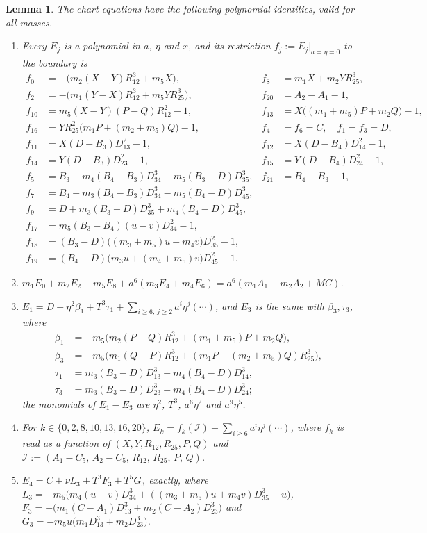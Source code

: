 \documentclass[Threeside,11pt]{article}
\newtheorem{lemma}[theorem]{Lemma}
\theoremstyle{definition}
\theoremstyle{remark}
\numberwithin{equation}{section}
\theoremstyle{remark}
\newenvironment{romanlist}{\begin{enumerate}\renewcommand{\labelenumi}{(\roman{enumi})}%
  \renewcommand{\theenumi}{\roman{enumi}}}{\end{enumerate}}
\begin{document}
{\begin{lemma}\label{lem:d8-rows}
The chart equations have the following polynomial identities, valid for all masses.
\begin{romanlist}
\item Every $E_j$ is a polynomial in $a$, $\eta$ and $x$, and its restriction
$f_j:=E_j|_{a=\eta=0}$ to the boundary is
\begin{align*}
  f_0&=-\bigl(m_2(X-Y)R_{12}^3+m_5X\bigr), & f_8&=m_1X+m_2YR_{25}^3,\\
  f_2&=-\bigl(m_1(Y-X)R_{12}^3+m_5YR_{25}^3\bigr), & f_{20}&=A_2-A_1-1,\\
  f_{10}&=m_5(X-Y)(P-Q)R_{12}^2-1, & f_{13}&=X\bigl((m_1+m_5)P+m_2Q\bigr)-1,\\
  f_{16}&=YR_{25}^2\bigl(m_1P+(m_2+m_5)Q\bigr)-1, & f_4&=f_6=C,\quad f_1=f_3=D,\\
  f_{11}&=X(D-B_3)D_{13}^2-1, & f_{12}&=X(D-B_4)D_{14}^2-1,\\
  f_{14}&=Y(D-B_3)D_{23}^2-1, & f_{15}&=Y(D-B_4)D_{24}^2-1,\\
  f_5&=B_3+m_4(B_4-B_3)D_{34}^3-m_5(B_3-D)D_{35}^3, & f_{21}&=B_4-B_3-1,\\
  f_7&=B_4-m_3(B_4-B_3)D_{34}^3-m_5(B_4-D)D_{45}^3,\\
  f_9&=D+m_3(B_3-D)D_{35}^3+m_4(B_4-D)D_{45}^3,\\
  f_{17}&=m_5(B_3-B_4)(u-v)D_{34}^2-1,\\
  f_{18}&=(B_3-D)\bigl((m_3+m_5)u+m_4v\bigr)D_{35}^2-1,\\
  f_{19}&=(B_4-D)\bigl(m_3u+(m_4+m_5)v\bigr)D_{45}^2-1.
\end{align*}
\item $m_1E_0+m_2E_2+m_5E_8+a^6(m_3E_4+m_4E_6)=a^6(m_1A_1+m_2A_2+MC)$.
\item $E_1=D+\eta^2\beta_1+T^3\tau_1+\sum_{i\ge6,\,j\ge2}a^i\eta^j(\cdots)$, and $E_3$ is the
same with $\beta_3,\tau_3$, where
\begin{align*}
  \beta_1&=-m_5\bigl(m_2(P-Q)R_{12}^3+(m_1+m_5)P+m_2Q\bigr),\\
  \beta_3&=-m_5\bigl(m_1(Q-P)R_{12}^3+(m_1P+(m_2+m_5)Q)R_{25}^3\bigr),\\
  \tau_1&=m_3(B_3-D)D_{13}^3+m_4(B_4-D)D_{14}^3,\\
  \tau_3&=m_3(B_3-D)D_{23}^3+m_4(B_4-D)D_{24}^3;
\end{align*}
the monomials of $E_1-E_3$ are $\eta^2$, $T^3$, $a^6\eta^2$ and $a^9\eta^5$.
\item For $k\in\{0,2,8,10,13,16,20\}$, $E_k=f_k(\mathcal I)+\sum_{i\ge6}a^i\eta^j(\cdots)$, where
$f_k$ is read as a function of $(X,Y,R_{12},R_{25},P,Q)$ and
$\mathcal I:=(A_1-C_5,\,A_2-C_5,\,R_{12},\,R_{25},\,P,\,Q)$.
\item $E_4=C+\nu L_3+T^3F_3+T^5G_3$ exactly, where
$L_3=-m_5\bigl(m_4(u-v)D_{34}^3+((m_3+m_5)u+m_4v)D_{35}^3-u\bigr)$,
$F_3=-\bigl(m_1(C-A_1)D_{13}^3+m_2(C-A_2)D_{23}^3\bigr)$ and
$G_3=-m_5u\bigl(m_1D_{13}^3+m_2D_{23}^3\bigr)$.
\end{romanlist}
\end{lemma}}
\end{document}
